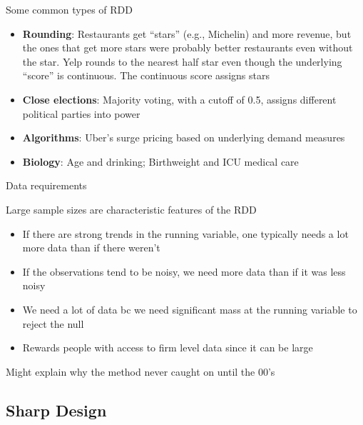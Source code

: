 \documentclass{beamer}
\begin{document}
	


\begin{frame}{Some common types of RDD}

		\begin{itemize}
		\item \textbf{Rounding}: Restaurants get ``stars'' (e.g., Michelin) and more revenue, but the ones that get more stars were probably better restaurants even without the star.  Yelp rounds to the nearest half star even though the underlying ``score'' is continuous.  The continuous score assigns stars
		\item \textbf{Close elections}: Majority voting, with a cutoff of 0.5, assigns different political parties into power
		\item \textbf{Algorithms}: Uber's surge pricing based on underlying demand measures 
		\item \textbf{Biology}: Age and drinking; Birthweight and ICU medical care
		\end{itemize}

\end{frame}

\begin{frame}{Data requirements}

Large sample sizes are characteristic features of the RDD

		\begin{itemize}
		\item If there are strong trends in the running variable, one typically needs a lot more data than if there weren't
		\item If the observations tend to be noisy, we need more data than if it was less noisy
		\item We need a lot of data bc we need significant mass at the running variable to reject the null
		\item Rewards people with access to firm level data since it can be large
		\end{itemize}
Might explain why the method never caught on until the 00's	


\end{frame}




\subsection{Sharp Design}
\end{document}
